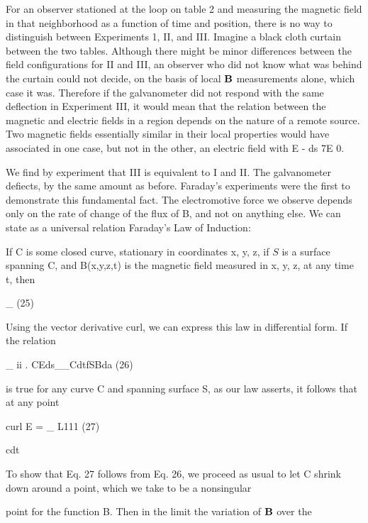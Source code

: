 For an observer stationed at the loop on table 2 and measuring
the magnetic field in that neighborhood as a function of time and
position, there is no way to distinguish between Experiments 1, II,
and III. Imagine a black cloth curtain between the two tables.
Although there might be minor differences between the field configurations
for II and III, an observer who did not know what was
behind the curtain could not decide, on the basis of local $\mathbf{B}$ measurements
alone, which case it was. Therefore if the galvanometer did
not respond with the same deflection in Experiment III, it would
mean that the relation between the magnetic and electric fields in a
region depends on the nature of a remote source. Two magnetic
fields essentially similar in their local properties would have associated
in one case, but not in the other, an electric field with
E - ds 7E 0.

We find by experiment that III is equivalent to I and II. The
galvanometer defiects, by the same amount as before. Faraday's
experiments were the first to demonstrate this fundamental fact.
The electromotive force we observe depends only on the rate of
change of the flux of B, and not on anything else. We can state as a
universal relation Faraday's Law of Induction:

If C is some closed curve, stationary in coordinates
x, y, z, if $S$ is a surface spanning C, and B(x,y,z,t) is the
magnetic field measured in x, y, z, at any time t, then

\begin{equation}
\end{equation}
_  (25)

 

Using the vector derivative curl, we can express this law in differential
form. If the relation

\begin{equation}
\end{equation}
_ ii .
CEds__CdtfSBda (26)

is true for any curve C and spanning surface S, as our law asserts, it
follows that at any point

\begin{equation}
\end{equation}
curl E = _ L111 (27)

cdt

To show that Eq. 27 follows from Eq. 26, we proceed as usual to let C
shrink down around a point, which we take to be a nonsingular

point for the function B. Then in the limit the variation of $\mathbf{B}$ over the

